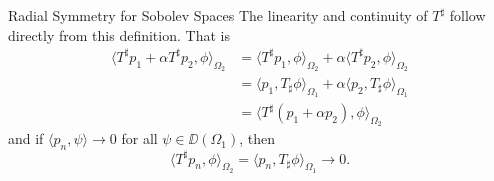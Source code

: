 \begin{chapter}{Radial Symmetry for Sobolev Spaces}
  The linearity and continuity of $T^\sharp$ follow directly from this definition.
  That is 
  \begin{align}
    \langle T^\sharp p_1 + \alpha T^\sharp p_2,\phi\rangle_{\Omega_2} 
    &= \langle T^\sharp p_1,\phi\rangle_{\Omega_2} + \alpha\langle T^\sharp p_2 ,\phi \rangle_{\Omega_2} \nonumber\\ 
    &= \langle p_1,T_\sharp\phi\rangle_{\Omega_1} + \alpha\langle p_2 ,T_\sharp\phi \rangle_{\Omega_1} \nonumber\\
    &= \langle T^\sharp(p_1+\alpha p_2),\phi\rangle_{\Omega_2} \label{eq:linearity} 
  \end{align} 
  and if $\langle p_n, \psi\rangle \to 0$ for all $\psi \in \DD(\Omega_1)$, then 
  \begin{equation}
    \langle T^\sharp p_n,\phi\rangle_{\Omega_2} = \langle p_n,T_\sharp\phi\rangle_{\Omega_1} \to 0.
  \end{equation}


\end{chapter}

